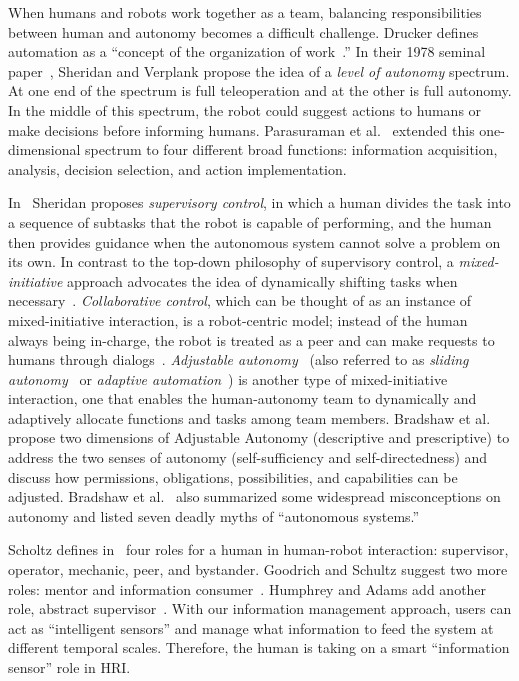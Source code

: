 When humans and robots work together as a team, balancing responsibilities between human and autonomy becomes a difficult challenge. Drucker defines automation as a ``concept of the organization of work~\cite{Drucker2006Practice}.'' In their 1978 seminal paper~\cite{Sheridan1978Human}, Sheridan and Verplank propose the idea of a \textit{level of autonomy} spectrum. At one end of the spectrum is full teleoperation and at the other is full autonomy. In the middle of this spectrum, the robot could suggest actions to humans or make decisions before informing humans. Parasuraman et al.\ \cite{Parasuraman2000Model} extended this one-dimensional spectrum to four different broad functions: information acquisition, analysis, decision selection, and action implementation. 

In~\cite{Sheridan1992Telerobotics} Sheridan proposes \textit{supervisory control}, in which a human divides the task into a sequence of subtasks that the robot is capable of performing, and the human then provides guidance when the autonomous system cannot solve a problem on its own. In contrast to the top-down philosophy of supervisory control, a \textit{mixed-initiative} approach advocates the idea of dynamically shifting tasks when necessary~\cite{Hearst1999Mixed}. \textit{Collaborative control}, which can be thought of as an instance of mixed-initiative interaction, is a robot-centric model; instead of the human always being in-charge, the robot is treated as a peer and can make requests to humans through dialogs~\cite{Fong1999Collaborative}. \textit{Adjustable autonomy}~\cite{Dorais2001Designing} (also referred to as \textit{sliding autonomy}~\cite{Dias2008SlidingAutonomy} or \textit{adaptive automation}~\cite{Rouse1988Adaptive}) is another type of mixed-initiative interaction, one that enables the human-autonomy team to dynamically and adaptively allocate functions and tasks among team members. Bradshaw et al.\ \cite{Bradshaw2004Dimensions} propose two dimensions of Adjustable Autonomy (descriptive  and prescriptive) to address the two senses of autonomy (self-sufficiency and self-directedness) and discuss how permissions, obligations, possibilities, and capabilities can be adjusted. Bradshaw et al.\ \cite{Bradshaw2013Seven} also summarized some widespread misconceptions on autonomy and listed seven deadly myths of ``autonomous systems.''

Scholtz defines in~\cite{Steinfeld2006Common} four roles for a human in human-robot interaction: supervisor, operator, mechanic, peer, and bystander. Goodrich and Schultz suggest two more roles: mentor and information consumer~\cite{Goodrich2007HRISurvey}. Humphrey and Adams add another role, abstract supervisor~\cite{Humphrey2009Information}. With our information management approach, users can act as ``intelligent sensors'' and manage what information to feed the system at different temporal scales. Therefore, the human is taking on a smart ``information sensor'' role in HRI. 

